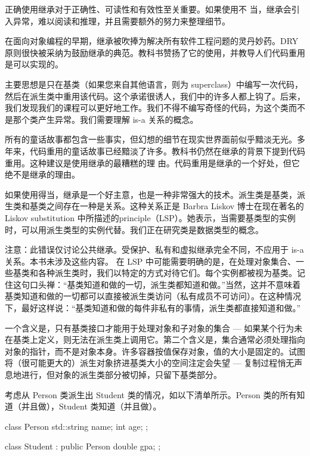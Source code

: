 正确使用继承对于正确性、可读性和有效性至关重要。如果使用不 当，继承会引入异常，难以阅读和推理，并且需要额外的努力来整理细节。

在面向对象编程的早期，继承被吹捧为解决所有软件工程问题的灵丹妙药。DRY 原则很快被采纳为鼓励继承的典范。教科书赞扬了它的使用，并教导人们代码重用是可以实现的。

主要思想是只在基类（如果您来自其他语言，则为 superclass）中编写一次代码，然后在派生类中重用该代码。这个承诺很诱人，我们中的许多人都上钩了。后来，我们发现我们的课程可以更好地工作。我们不得不编写奇怪的代码，为这个类而不是那个类产生异常。我们需要理解 is-a 关系的概念。

所有的童话故事都包含一些事实，但幻想的细节在现实世界面前似乎黯淡无光。多年来，代码重用的童话故事已经黯淡了许多。教科书仍然在继承的背景下提到代码重用。这种建议是使用继承的最糟糕的理 由。代码重用是继承的一个好处，但它绝不是继承的理由。


如果使用得当，继承是一个好主意，也是一种非常强大的技术。派生类是基类，派生类和基类之间存在一种是关系。这种关系正是 Barbra Liskov 博士在现在著名的 Liskov substitution 中所描述的principle（LSP）。她表示，当需要基类型的实例时，可以用派生类型的实例代替。我们正在研究类是数据类型的概念。

注意：此错误仅讨论公共继承。受保护、私有和虚拟继承完全不同，不应用于 is-a 关系。本书未涉及这些内容。
在 LSP 中可能需要明确的是，在处理对象集合、一些基类和各种派生类时，我们以特定的方式对待它们。每个实例都被视为基类。记住这句口头禅：“基类知道和做的一切，派生类都知道和做。”当然，这并不意味着基类知道和做的一切都可以直接被派生类访问（私有成员不可访问）。在这种情况下，最好这样说：“基类知道和做的每件非私有的事情，派生类都直接知道和做。”

一个含义是，只有基类接口才能用于处理对象和子对象的集合 — 如果某个行为未在基类上定义，则无法在派生类上调用它。第二个含义是，集合通常必须处理指向对象的指针，而不是对象本身。许多容器按值保存对象，值的大小是固定的。试图将（很可能更大的）派生对象挤进基类大小的空间注定会失望 — 复制过程悄无声息地进行，但对象的派生类部分被切掉，只留下基类部分。

考虑从 Person 类派生出 Student 类的情况，如以下清单所示。Person 类的所有知道（并且做），Student 类知道（并且做）。


\begin{cpp}
class Person {
  std::string name;
  int age;
};

class Student : public Person {
  double gpa;
};
\end{cpp}

